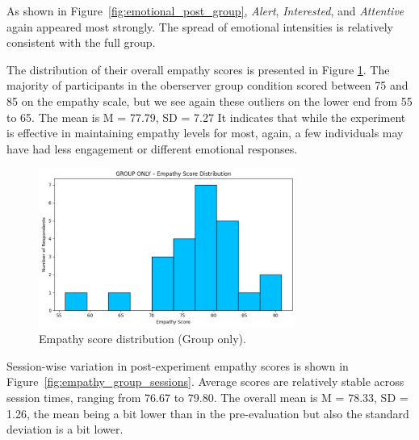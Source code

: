 As shown in Figure~\ref{fig:emotional_post_group}, \textit{Alert}, \textit{Interested}, and \textit{Attentive} again appeared most strongly. The spread of emotional intensities is relatively consistent with the full group.

\vspace{1em}

The distribution of their overall empathy scores is presented in Figure \ref{fig:empathy_group_post}. The majority of participants in the oberserver group condition scored between 75 and 85 on the empathy scale, but we see again these outliers on the lower end from 55 to 65. The mean is M = 77.79, SD = 7.27 It indicates that while the experiment is effective in maintaining empathy levels for most, again, a few individuals may have had less engagement or different emotional responses. 


\begin{figure}[htbp]
    \centering
    \includegraphics[width=0.75\textwidth]{../../Figures/empathy-score-post-grp.png}
    \caption{Empathy score distribution (Group only).}
    \label{fig:empathy_group_post}
\end{figure}

\vspace{1em}

Session-wise variation in post-experiment empathy scores is shown in Figure~\ref{fig:empathy_group_sessions}. Average scores are relatively stable across session times, ranging from 76.67 to 79.80. The overall mean is M = 78.33, SD = 1.26, the mean being a bit lower than in the pre-evaluation but also the standard deviation is a bit lower. 

